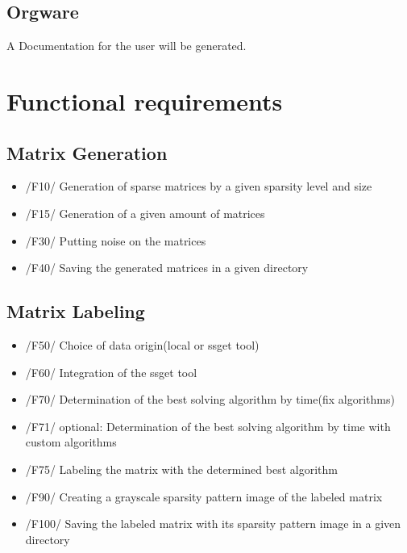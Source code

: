 \documentclass[parskip=full]{scrartcl}
\begin{document}
\subsection{Orgware}
A Documentation for the user will be generated.


\section{Functional requirements}
\subsection{Matrix Generation}
	\begin{itemize}
	\item /F10/ Generation of sparse matrices by a given sparsity level and size
	\item /F15/ Generation of a given amount of matrices
	\item /F30/ Putting noise on the matrices
 	\item /F40/ Saving the generated matrices in a given directory
          \end{itemize}
\subsection{Matrix Labeling}
	\begin{itemize}
	\item /F50/ Choice of data origin(local or ssget tool) 
	\item /F60/ Integration of the ssget tool
	\item /F70/ Determination of the best solving algorithm by time(fix algorithms)
	\item /F71/ optional: Determination of the best solving algorithm by time with custom algorithms
	\item /F75/ Labeling the matrix with the determined best algorithm
	\item /F90/ Creating a grayscale sparsity pattern image of the labeled matrix
	\item /F100/ Saving the labeled matrix with its sparsity pattern image in a given directory 
	\end{itemize}
	
	
\end{document}
